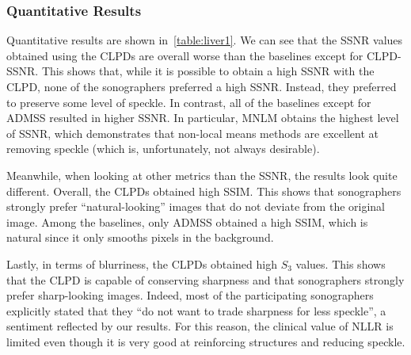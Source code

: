 
%
\subsubsection{Quantitative Results}
Quantitative results are shown in~\cref{table:liver1}.
We can see that the SSNR values obtained using the CLPDs are overall worse than the baselines except for CLPD-SSNR.
This shows that, while it is possible to obtain a high SSNR with the CLPD, none of the sonographers preferred a high SSNR.
Instead, they preferred to preserve some level of speckle.
In contrast, all of the baselines except for ADMSS resulted in higher SSNR.
In particular, MNLM obtains the highest level of SSNR, which demonstrates that non-local means methods are excellent at removing speckle (which is, unfortunately, not always desirable).

Meanwhile, when looking at other metrics than the SSNR, the results look quite different.
Overall, the CLPDs obtained high SSIM.
This shows that sonographers strongly prefer ``natural-looking'' images that do not deviate from the original image.
Among the baselines, only ADMSS obtained a high SSIM, which is natural since it only smooths pixels in the background.

Lastly, in terms of blurriness, the CLPDs obtained high \(S_3\) values.
This shows that the CLPD is capable of conserving sharpness and that sonographers strongly prefer sharp-looking images.
Indeed, most of the participating sonographers explicitly stated that they ``do not want to trade sharpness for less speckle'', a sentiment reflected by our results.
For this reason, the clinical value of NLLR is limited even though it is very good at reinforcing structures and reducing speckle.

